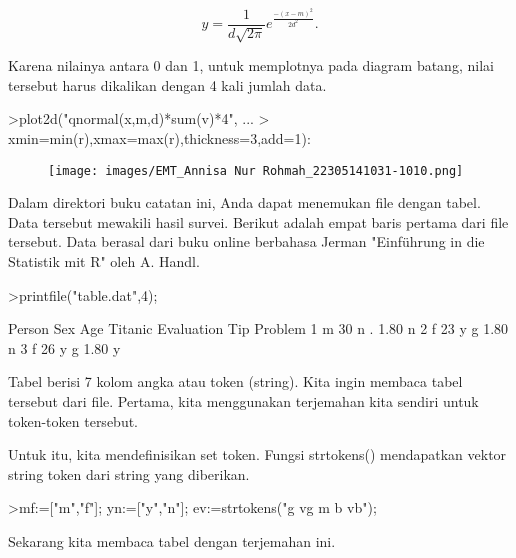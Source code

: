 \documentclass[a4paper,10pt]{article}
\begin{document}
\begin{eulernotebook}
\begin{eulercomment}
\begin{eulercomment}
\begin{eulercomment}
\begin{eulercomment}
\begin{eulercomment}
\end{eulercomment}
\begin{eulerformula}
\[
y=\frac{1}{d\sqrt{2\pi}}e^{\frac{-(x-m)^2}{2d^2}}.
\]
\end{eulerformula}
\begin{eulercomment}
Karena nilainya antara 0 dan 1, untuk memplotnya pada diagram batang,
nilai tersebut harus dikalikan dengan 4 kali jumlah data.
\end{eulercomment}
\begin{eulerprompt}
>plot2d("qnormal(x,m,d)*sum(v)*4", ...
>  xmin=min(r),xmax=max(r),thickness=3,add=1):
\end{eulerprompt}
\begin{figure}[h]
    \centering
    \texttt{[image: images/EMT\_Annisa Nur Rohmah\_22305141031-1010.png]}
\end{figure}
\begin{eulercomment}
Dalam direktori buku catatan ini, Anda dapat menemukan file dengan
tabel. Data tersebut mewakili hasil survei. Berikut adalah empat baris
pertama dari file tersebut. Data berasal dari buku online berbahasa
Jerman "Einführung in die Statistik mit R" oleh A. Handl.
\end{eulercomment}
\begin{eulerprompt}
>printfile("table.dat",4);
\end{eulerprompt}
\begin{euleroutput}
  Person Sex Age Titanic Evaluation Tip Problem
  1 m 30 n . 1.80 n
  2 f 23 y g 1.80 n
  3 f 26 y g 1.80 y
\end{euleroutput}
\begin{eulercomment}
Tabel berisi 7 kolom angka atau token (string). Kita ingin membaca
tabel tersebut dari file. Pertama, kita menggunakan terjemahan kita
sendiri untuk token-token tersebut.

Untuk itu, kita mendefinisikan set token. Fungsi strtokens()
mendapatkan vektor string token dari string yang diberikan.
\end{eulercomment}
\begin{eulerprompt}
>mf:=["m","f"]; yn:=["y","n"]; ev:=strtokens("g vg m b vb");
\end{eulerprompt}
\begin{eulercomment}
Sekarang kita membaca tabel dengan terjemahan ini.


\end{eulercomment}
\end{eulercomment}
\end{eulercomment}
\end{eulercomment}
\end{eulercomment}
\end{eulernotebook}
\end{document}
